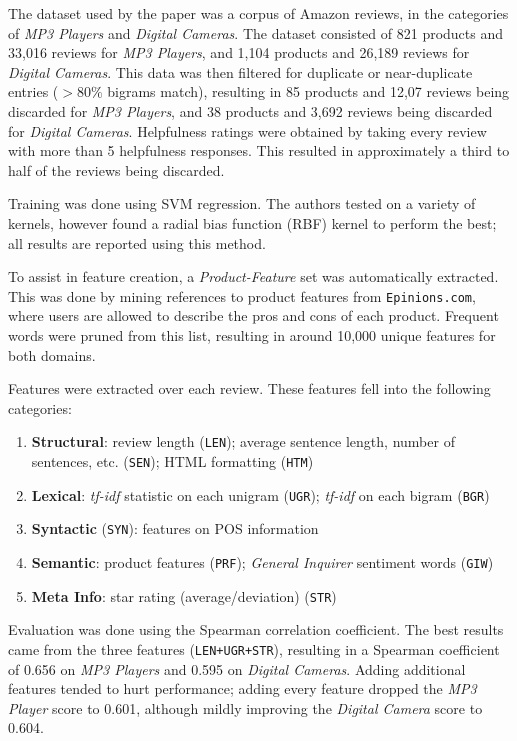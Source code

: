 \documentclass[letter,12pt]{article}
\begin{document}
The dataset used by the paper was a corpus of Amazon reviews, in the categories
	of {\em MP3 Players} and {\em Digital Cameras}.
The dataset consisted of 821 products and 33,016 reviews for {\em MP3 Players},
	and 1,104 products and 26,189 reviews for {\em Digital Cameras}.
This data was then filtered for duplicate or near-duplicate entries ($>80\%$ bigrams match),
	resulting in 85 products and 12,07 reviews being discarded for {\em MP3 Players},
	and 38 products and 3,692 reviews being discarded for {\em Digital Cameras}.
Helpfulness ratings were obtained by taking every review with more than 5 helpfulness
	responses.
This resulted in approximately a third to half of the reviews being discarded.

Training was done using SVM regression.
The authors tested on a variety of kernels, however found a radial bias function (RBF)
	kernel to perform the best; all results are reported using this method.

To assist in feature creation, a {\em Product-Feature} set was automatically extracted.
This was done by mining references to product features from {\tt Epinions.com},
	where users are allowed to describe the pros and cons of each product.
Frequent words were pruned from this list, resulting in around 10,000 unique features
	for both domains.

Features were extracted over each review.
These features fell into the following categories:
\begin{enumerate}
	\item {\bf Structural}: review length ({\tt LEN}); average sentence length, 
		number of sentences, etc. ({\tt SEN}); 
		HTML formatting ({\tt HTM})
	\item {\bf Lexical}: {\it tf-idf} statistic on each unigram ({\tt UGR});
		{\it tf-idf} on each bigram ({\tt BGR})
	\item {\bf Syntactic} ({\tt SYN}): features on POS information
	\item {\bf Semantic}: product features ({\tt PRF}); 
		{\it General Inquirer} sentiment words ({\tt GIW}) 
	\item {\bf Meta Info}: star rating (average/deviation) ({\tt STR})
\end{enumerate}

Evaluation was done using the Spearman correlation coefficient.
The best results came from the three features ({\tt LEN+UGR+STR}),
	resulting in a Spearman coefficient of 0.656 on {\em MP3 Players}
	and 0.595 on {\em Digital Cameras}.
Adding additional features tended to hurt performance; adding every feature
	dropped the {\em MP3 Player} score to 0.601,
	although mildly improving the {\em Digital Camera} score to 0.604.
\end{document}
